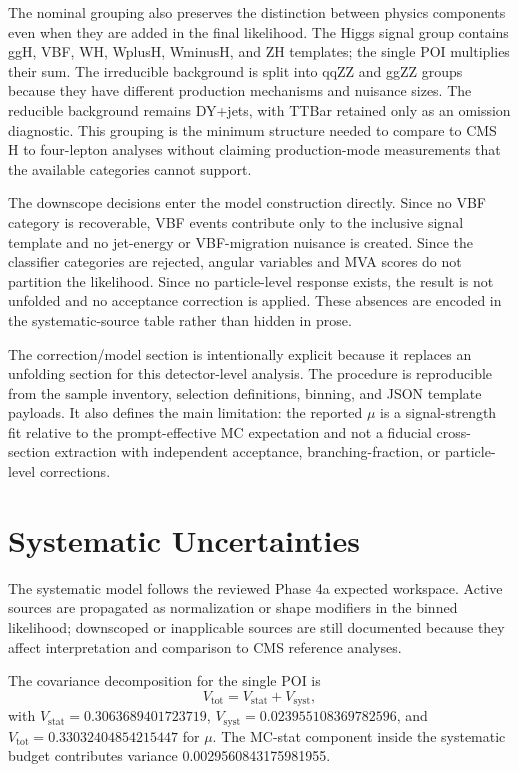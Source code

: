 \documentclass[11pt]{article}
\begin{document}
The nominal grouping also preserves the distinction between physics components even when they are added in the final likelihood. The Higgs signal group contains ggH, VBF, WH, WplusH, WminusH, and ZH templates; the single POI multiplies their sum. The irreducible background is split into qqZZ and ggZZ groups because they have different production mechanisms and nuisance sizes. The reducible background remains DY+jets, with TTBar retained only as an omission diagnostic. This grouping is the minimum structure needed to compare to CMS H to four-lepton analyses without claiming production-mode measurements that the available categories cannot support.

The downscope decisions enter the model construction directly. Since no VBF category is recoverable, VBF events contribute only to the inclusive signal template and no jet-energy or VBF-migration nuisance is created. Since the classifier categories are rejected, angular variables and MVA scores do not partition the likelihood. Since no particle-level response exists, the result is not unfolded and no acceptance correction is applied. These absences are encoded in the systematic-source table rather than hidden in prose.

The correction/model section is intentionally explicit because it replaces an unfolding section for this detector-level analysis. The procedure is reproducible from the sample inventory, selection definitions, binning, and JSON template payloads. It also defines the main limitation: the reported $\mu$ is a signal-strength fit relative to the prompt-effective MC expectation and not a fiducial cross-section extraction with independent acceptance, branching-fraction, or particle-level corrections.
\section{Systematic Uncertainties}
The systematic model follows the reviewed Phase 4a expected workspace. Active sources are propagated as normalization or shape modifiers in the binned likelihood; downscoped or inapplicable sources are still documented because they affect interpretation and comparison to CMS reference analyses.

The covariance decomposition for the single POI is
\begin{equation}
 V_{\mathrm{tot}} = V_{\mathrm{stat}} + V_{\mathrm{syst}},
 \label{eq:cov-sum}
\end{equation}
with $V_{\mathrm{stat}}=0.3063689401723719$, $V_{\mathrm{syst}}=0.023955108369782596$, and $V_{\mathrm{tot}}=0.33032404854215447$ for $\mu$. The MC-stat component inside the systematic budget contributes variance 0.0029560843175981955.
\end{document}
